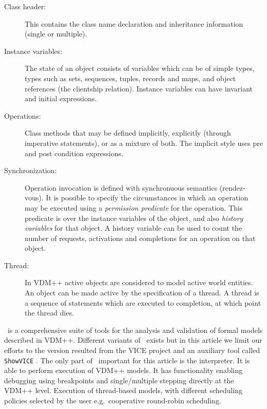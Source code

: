 \begin{description}
\item[Class header:] This contains the class name declaration and
inheritance information (single or multiple).

\item[Instance variables:] The state of an object consists of
variables which can be of simple types, types
such as sets, sequences, tuples, records and maps, and object
references (the clientship relation). Instance variables can have
invariant and initial expressions.

\item[Operations:] Class methods that may be defined implicitly,
explicitly (through imperative statements),
or as a mixture of both. The implicit style uses pre and
post condition expressions. 


\item[Synchronization:] Operation invocation is defined with 
synchronuous semantics (rendez-vous). It is possible to specify the
circumstances in which an operation may be executed using a
\textit{permission predicate} for the operation. This predicate is
over the instance variables of the object, and also \textit{history
variables} for that object. A history variable can be used to count
the number of requests, activations and completions for an operation
on that object.

\item[Thread:] In VDM++ active objects are considered to
model active world entities. An object can be
made active by the specification of a thread. A thread is a sequence
of statements which are executed to completion, at which point the
thread dies. 
\end{description}

\vdmtools\ is a comprehensive suite of tools for
the analysis and validation of formal models described in
VDM++. Different variants of \vdmtools\ exists but in this article we
limit our efforts to the version resulted from the VICE project and an
auxiliary tool called \texttt{ShowVICE} \cite{Verhoef05}. The only part of 
\vdmtools\ important for this article is the interpreter. It is able 
to perform execution of VDM++ models. It has functionality enabling 
debugging using breakpoints and single/multiple stepping directly at the
VDM++ level. Execution of thread-based models, with different scheduling 
policies selected by the user e.g.\ cooperative round-robin scheduling.

